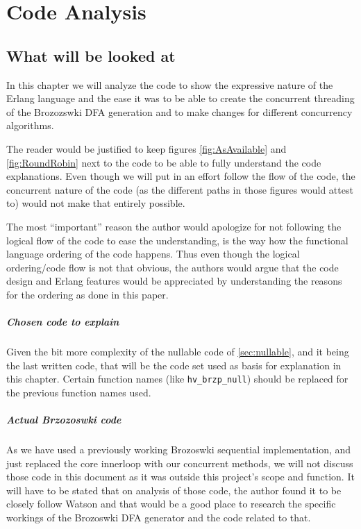 \chapter{Code Analysis}

\section{What will be looked at}

In this chapter we will analyze the code to show the expressive nature
of the Erlang language and the ease it was to be able to create the
concurrent threading of the Brozozswki DFA generation and to make
changes for different concurrency algorithms.

The reader would be justified to keep figures \ref{fig:AsAvailable} and
\ref{fig:RoundRobin} next to the code to be able to fully understand the
code explanations. Even though we will put in an effort follow the flow of the
code, the concurrent nature of the code (as the different paths in
those figures would attest to) would not make that entirely
possible.

The most ``important'' reason the author would apologize for not
following the logical flow of the code to ease the understanding, is
the way how the functional language ordering of the code happens. Thus
even though the logical ordering/code flow is not that obvious, the
authors would argue that the code design and Erlang features would be
appreciated by understanding the reasons for the ordering as done in
this paper.

\paragraph{Chosen code to explain}

Given the bit more complexity of the nullable code of
\ref{sec:nullable}, and it being the last written code, that will be
the code set used as basis for explanation in this chapter. Certain
function names (like \texttt{hv\_brzp\_null}) should be replaced for
the previous function names used.

\paragraph{Actual Brzozoswki code}

As we have used a previously working Brozoswki sequential
implementation, and just replaced the core innerloop with our
concurrent methods, we will not discuss those code in this document as
it was outside this project's scope and function. It will have to be
stated that on analysis of those code, the author found it to be
closely follow Watson\cite{WatsonPhD} and that would be a good place
to research the specific workings of the Brozoswki DFA generator and
the code related to that.

